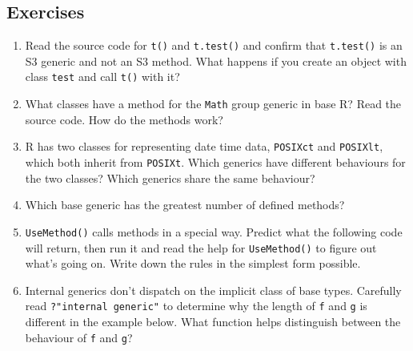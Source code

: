 \subsection{Exercises}

\begin{enumerate}
\def\labelenumi{\arabic{enumi}.}
\item
  Read the source code for \texttt{t()} and \texttt{t.test()} and
  confirm that \texttt{t.test()} is an S3 generic and not an S3 method.
  What happens if you create an object with class \texttt{test} and call
  \texttt{t()} with it?
\item
  What classes have a method for the \texttt{Math} group generic in base
  R? Read the source code. How do the methods work?
\item
  R has two classes for representing date time data, \texttt{POSIXct}
  and \texttt{POSIXlt}, which both inherit from \texttt{POSIXt}. Which
  generics have different behaviours for the two classes? Which generics
  share the same behaviour?
\item
  Which base generic has the greatest number of defined methods?
\item
  \texttt{UseMethod()} calls methods in a special way. Predict what the
  following code will return, then run it and read the help for
  \texttt{UseMethod()} to figure out what's going on. Write down the
  rules in the simplest form possible.

\begin{Shaded}
\begin{Highlighting}[]
\StringTok{ }
\StringTok{ }
  \StringTok{ }
  \NormalTok{(}\NormalTok{)}
\NormalTok{\}}
\StringTok{ }
\NormalTok{(}\NormalTok{)}

\StringTok{ }
  \StringTok{ }
  \NormalTok{(}\NormalTok{)}
\NormalTok{\}}
\StringTok{ }\NormalTok{(}
\StringTok{ }\NormalTok{(}

\NormalTok{(}\NormalTok{)}
\end{Highlighting}
\end{Shaded}
\item
  Internal generics don't dispatch on the implicit class of base types.
  Carefully read \texttt{?"internal generic"} to determine why the
  length of \texttt{f} and \texttt{g} is different in the example below.
  What function helps distinguish between the behaviour of \texttt{f}
  and \texttt{g}?


\end{enumerate}
